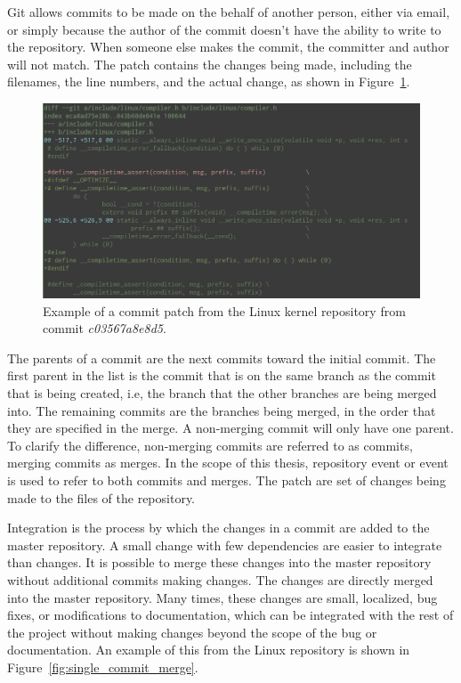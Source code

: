 Git allows commits to be made on the behalf of another person, either
via email, or simply because the author of the commit doesn't have the
ability to write to the repository.
When someone else makes the commit, the committer and author will not
match. The patch contains the changes being made, including the
filenames, the line numbers, and the actual change, as shown in
Figure~\ref{fig:commit_patch}.

\begin{figure}[htpb]
  \centering
  \includegraphics[width=0.8\linewidth]{Figures/background/commit_patch.png}
  \caption{Example of a commit patch from the Linux kernel repository
    from commit \textit{c03567a8e8d5}.}
  \label{fig:commit_patch}
\end{figure}

The parents of a commit are the next commits toward the initial commit.
The first parent in the list is the commit that is on the same branch
as the commit that is being created, i.e, the branch that the other
branches are being merged into.
The remaining commits are the branches being merged, in the order that
they are specified in the merge.
A non-merging commit will only have one parent.
To clarify the difference, non-merging commits are referred to as
commits, merging commits as merges.
In the scope of this thesis, repository event or event is used to refer
to both commits and merges.
The patch are set of changes being made to the files of the repository.

Integration is the process by which the changes in a commit are added to
the master repository.
A small change with few dependencies are easier to integrate than
changes.
It is possible to merge these changes into the master repository
without additional commits making changes.
The changes are directly merged into the master repository.
Many times, these changes are small, localized, bug fixes, or modifications to
documentation, which can be integrated with the rest of the project
without making changes beyond the scope of the bug or documentation.
An example of this from the Linux repository is shown in
Figure~\ref{fig:single_commit_merge}.

